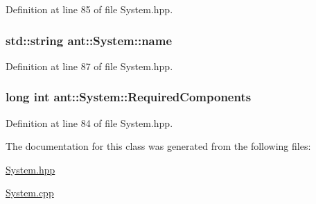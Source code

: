 Definition at line 85 of file System.\+hpp.

\hypertarget{classant_1_1_system_a60b3c00a760a3b4947ab1f1fc534a5b2}{
\subsubsection[{name}]{\setlength{\rightskip}{0pt plus 5cm}std\+::string ant\+::\+System\+::name\hspace{0.3cm}{\ttfamily [protected]}}}\label{classant_1_1_system_a60b3c00a760a3b4947ab1f1fc534a5b2}


Definition at line 87 of file System.\+hpp.

\hypertarget{classant_1_1_system_a4ef41cfc496e41ac6730f90629524ec7}{
\subsubsection[{Required\+Components}]{\setlength{\rightskip}{0pt plus 5cm}long int ant\+::\+System\+::\+Required\+Components\hspace{0.3cm}{\ttfamily [protected]}}}\label{classant_1_1_system_a4ef41cfc496e41ac6730f90629524ec7}


Definition at line 84 of file System.\+hpp.



The documentation for this class was generated from the following files\+:\begin{DoxyCompactItemize}
\item 
\hyperlink{_system_8hpp}{System.\+hpp}\item 
\hyperlink{_system_8cpp}{System.\+cpp}\end{DoxyCompactItemize}
